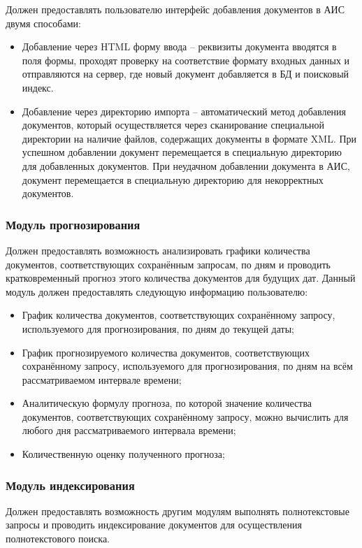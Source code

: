 \documentclass[russian,utf8,emptystyle]{eskdtext}
\begin{document}
Должен предоставлять пользователю интерфейс добавления документов в АИС двумя способами:
\begin{itemize}
\item Добавление через HTML форму ввода – реквизиты документа вводятся в поля формы, проходят проверку на соответствие формату входных данных и отправляются на сервер, где новый документ добавляется в БД и поисковый индекс.
\item Добавление через директорию импорта – автоматический метод добавления документов, который осуществляется через сканирование специальной директории на наличие файлов, содержащих документы в формате XML. При успешном добавлении документ перемещается в специальную директорию для добавленных документов. При неудачном добавлении документа в АИС, документ перемещается в специальную директорию для некорректных документов.
\end{itemize}

\subsubsection{Модуль прогнозирования}

Должен предоставлять возможность анализировать графики количества документов, соответствующих сохранённым запросам, по дням и проводить кратковременный прогноз этого количества документов для будущих дат. Данный модуль должен предоставлять следующую информацию пользователю:
\begin{itemize}
\item График количества документов, соответствующих сохранённому запросу, используемого для прогнозирования, по дням до текущей даты;
\item График прогнозируемого количества документов, соответствующих сохранённому запросу, используемого для прогнозирования, по дням на всём рассматриваемом интервале времени;
\item Аналитическую формулу прогноза, по которой значение количества документов, соответствующих сохранённому запросу, можно вычислить для любого дня рассматриваемого интервала времени;
\item Количественную оценку полученного прогноза;
\end{itemize}

\subsubsection{Модуль индексирования}

Должен предоставлять возможность другим модулям выполнять полнотекстовые запросы и проводить индексирование документов для осуществления полнотекстового поиска.
\end{document}
